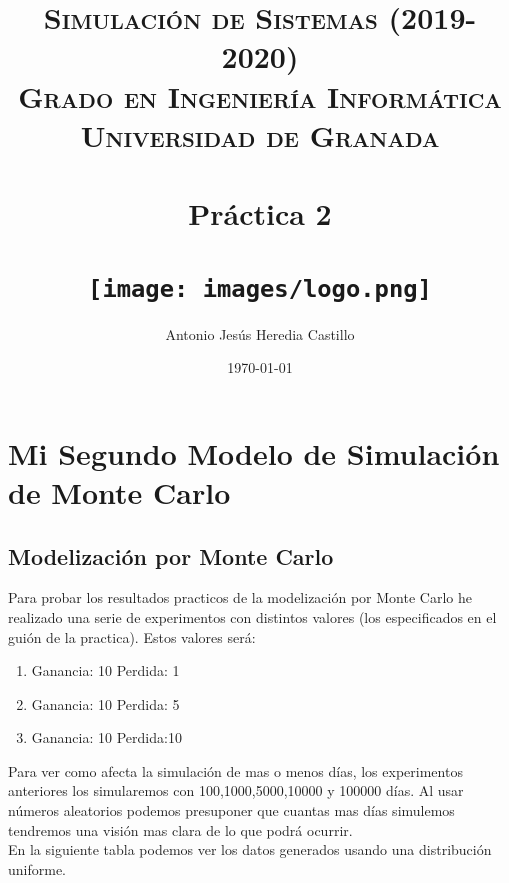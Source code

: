 \documentclass[12pt,a4paper]{article}
\title{
\normalfont \normalsize 
\textsc{{\bf Simulación de Sistemas (2019-2020)} \\ Grado en Ingeniería Informática \\ Universidad de Granada} \\ [25pt] %
\horrule{0.5pt} \\[0.4cm] %
\huge Práctica 2 \\ %
\horrule{2pt} \\[0.5cm] %
\texttt{[image: images/logo.png]}	
}
\author{Antonio Jesús Heredia Castillo} %
\date{\normalsize\today} %
\begin{document}
\maketitle %

\newpage
\tableofcontents %
\newpage %
\listoffigures
\newpage
\section{Mi Segundo Modelo de Simulación de Monte Carlo}
\subsection{Modelización por Monte Carlo}
Para probar los resultados practicos de la modelización por Monte Carlo he realizado una serie de experimentos con distintos valores (los especificados en el guión de la practica). Estos valores será:
\begin{enumerate}
	\item Ganancia: 10 Perdida: 1
	\item Ganancia: 10 Perdida: 5
	\item Ganancia: 10 Perdida:10
\end{enumerate}
Para ver como afecta la simulación de mas o menos días, los experimentos anteriores los simularemos con 100,1000,5000,10000 y 100000 días. Al usar números aleatorios podemos presuponer que cuantas mas días simulemos tendremos una visión mas clara de lo que podrá ocurrir. \\ En la siguiente tabla podemos ver los datos generados usando una distribución uniforme. 
\end{document}
